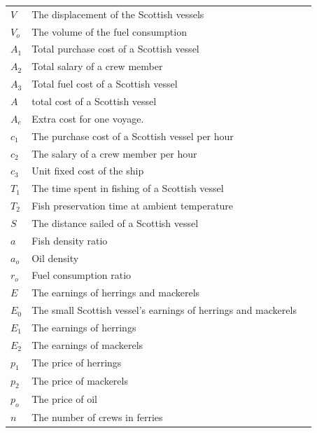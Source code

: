 \documentclass{mcmthesis}
\begin{document}
\begin{center}
\begin{longtable}{p{}p{}m{}}
$V$      & The displacement of the Scottish vessels 
                                                          \\
$V_o$      & The volume of the fuel consumption
                                                          \\
$A_1$     & Total purchase cost of a Scottish vessel
                                                        \\
$A_2$       & Total salary of a crew member                                                           \\
$A_3$      & Total fuel cost of a Scottish vessel                                        \\
$A$      & total cost of a Scottish vessel                                        \\
$A_e$      &Extra cost for one voyage.  \\
$c_1$     & The purchase cost of a Scottish vessel per hour
                                                        \\
$c_2$       & The salary of a crew member per hour                                                     \\
$c_3$      & Unit fixed cost of the ship  \\
$T_1$     & The time spent in fishing of a Scottish vessel   
                                                        \\
$T_2$       & Fish preservation time at ambient temperature        \\

$S$      & The distance sailed of a Scottish vessel   \\
$a$      & Fish density ratio \\
$a_o$      & Oil density \\
$r_o$      & Fuel consumption ratio \\
$E$      & The earnings  of herrings and mackerels \\
$E_0$      & The small Scottish vessel's earnings  of herrings and mackerels \\
$E_1$      & The earnings  of herrings\\
$E_2$      & The earnings  of mackerels\\
$p_1$      & The price  of herrings \\
$p_2$      & The price  of mackerels  \\
$p_o$      & The price  of oil  \\
$n$      & The number  of  crews in ferries \\






 \end{longtable}
 \end{center}
\end{document}

